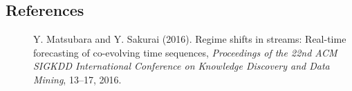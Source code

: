 \documentclass[12pt]{article}
\begin{document}
%        
%
%        

\subsection*{References}


\begin{description}


\item[]  Y. Matsubara and Y. Sakurai (2016).
Regime shifts in streams: Real-time forecasting of co-evolving time sequences, {\it Proceedings of the 22nd ACM SIGKDD International Conference on Knowledge Discovery and Data Mining}, 13--17, 2016.

		   

\end{description}
\end{document}
